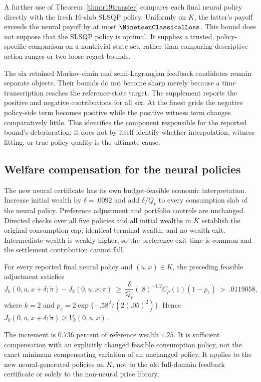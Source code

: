 A further use of Theorem~\ref{thm:r19transfer} compares each final neural policy directly with the fresh 16-slab SLSQP policy. Uniformly on $K$, the latter's payoff exceeds the neural payoff by at most $\NineteenClassicalLoss$. This bound does not suppose that the SLSQP policy is optimal. It supplies a trusted, policy-specific comparison on a nontrivial state set, rather than comparing descriptive action ranges or two loose regret bounds.

The six retained Markov-chain and semi-Lagrangian feedback candidates remain separate objects. Their bounds do not become sharp merely because a time transcription reaches the reference-state target. The supplement reports the positive and negative contributions for all six. At the finest grids the negative policy-side term becomes positive while the positive witness term changes comparatively little. This identifies the component responsible for the reported bound's deterioration; it does not by itself identify whether interpolation, witness fitting, or true policy quality is the ultimate cause.

\subsection{Welfare compensation for the neural policies}
The new neural certificate has its own budget-feasible economic interpretation. Increase initial wealth by $\delta=.0092$ and add $\delta/Q_r$ to every consumption slab of the neural policy. Preference adjustment and portfolio controls are unchanged. Directed checks over all five policies and all initial wealths in $K$ establish the original consumption cap, identical terminal wealth, and no wealth exit. Intermediate wealth is weakly higher, so the preference-exit time is common and the settlement contribution cannot fall.

\begin{proposition}\label{prop:r19wealth}
For every reported final neural policy and $(u,x)\in K$, the preceding feasible adjustment satisfies
\[
 J_k(0,u,x+\delta;\widetilde\pi)-J_k(0,u,x;\pi)
 \ \geq\ \frac\delta{Q_r}(.8)^{-1.2}C_\rho(1)(1-p_e)
 \ >\ .0119058,
\]
where $k=2$ and $p_e=2\exp\{- .58^2/(2(.05)^2)\}$. Hence
$J_k(0,u,x+\delta;\widetilde\pi)\geq V_k(0,u,x)$.
\end{proposition}
The increment is 0.736 percent of reference wealth $1.25$. It is sufficient compensation with an explicitly changed feasible consumption policy, not the exact minimum compensating variation of an unchanged policy. It applies to the new neural-generated policies on $K$, not to the old full-domain feedback certificate or solely to the non-neural price library.
